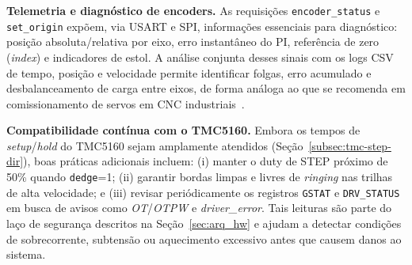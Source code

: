\medskip
\noindent\textbf{Telemetria e diagn\'ostico de encoders.}
As requisi\c{c}\~oes \texttt{encoder\_status} e \texttt{set\_origin} exp\~oem,
via USART e SPI, informa\c{c}\~oes essenciais para diagn\'ostico: posi\c{c}\~ao
absoluta/relativa por eixo, erro instant\^aneo do PI, refer\^encia de zero
(\emph{index}) e indicadores de estol. A an\'alise conjunta desses sinais com
os logs CSV de tempo, posi\c{c}\~ao e velocidade permite identificar folgas,
erro acumulado e desbalanceamento de carga entre eixos, de forma an\'aloga
ao que se recomenda em comissionamento de servos em CNC industriais~\cite{kenjo1994,efficient_reference}.

\medskip
\noindent\textbf{Compatibilidade cont\'inua com o TMC5160.}
Embora os tempos de \emph{setup}/\emph{hold} do TMC5160 sejam amplamente
atendidos (Se\c{c}\~ao~\ref{subsec:tmc-step-dir}), boas pr\'aticas adicionais
incluem: (i) manter o duty de STEP pr\'oximo de 50\% quando \texttt{dedge}=1;
(ii) garantir bordas limpas e livres de \emph{ringing} nas trilhas de alta
velocidade; e (iii) revisar peri\'odicamente os registros \texttt{GSTAT} e
\texttt{DRV\_STATUS} em busca de avisos como \emph{OT}/\emph{OTPW} e
\emph{driver\_error}. Tais leituras s\~ao parte do la\c{c}o de seguran\c{c}a
descritos na Se\c{c}\~ao~\ref{sec:arq_hw} e ajudam a detectar condi\c{c}\~oes de
sobrecorrente, subtens\~ao ou aquecimento excessivo antes que causem danos
ao sistema.


